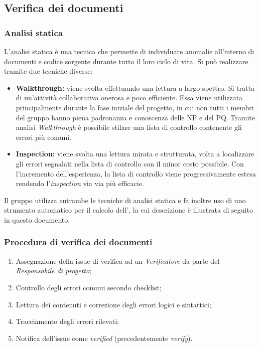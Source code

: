 \documentclass[../NormediProgetto.tex]{subfiles}
\begin{document}
\subsection{Verifica dei documenti}

\subsubsection{Analisi statica}

L’analisi statica è una tecnica che permette di individuare anomalie all’interno di documenti e codice sorgente durante tutto il loro ciclo di vita. Si può realizzare tramite due tecniche diverse:

\begin{itemize}
    \item \textbf{Walkthrough:} viene svolta effettuando una lettura a largo spettro. Si tratta di un’attività collaborativa onerosa e poco efficiente. Essa viene utilizzata principalmente durante la fase iniziale del progetto, in cui non tutti i membri del gruppo hanno piena padronanza e conoscenza delle NP e del PQ. Tramite analisi \textit{Walkthrough} è possibile stilare una lista di controllo contenente gli errori più comuni.
    
    \item \textbf{Inspection:} viene svolta una lettura mirata e strutturata, volta a localizzare gli errori segnalati nella lista di controllo con il minor costo possibile. Con l'incremento dell'esperienza, la lista di controllo viene progressivamente estesa rendendo l’\textit{inspection} via via più efficacie.
\end{itemize}

Il gruppo utilizza entrambe le tecniche di analisi statica e fa inoltre uso di uno strumento automatico per il calcolo dell', la cui descrizione è illustrata di seguito in questo documento.

\subsubsection{Procedura di verifica dei documenti}

\begin{enumerate}
    \item Assegnazione della issue di verifica ad un \textit{Verificatore} da parte del \textit{Responsabile di progetto};
    
    \item Controllo degli errori comuni secondo checklist;
    
    \item Lettura dei contenuti e correzione degli errori logici e sintattici;
    
    \item Tracciamento degli errori rilevati;
    
    \item Notifica dell'issue come \textit{verified} (precedentemente \textit{verify}).
\end{enumerate}
\end{document}

